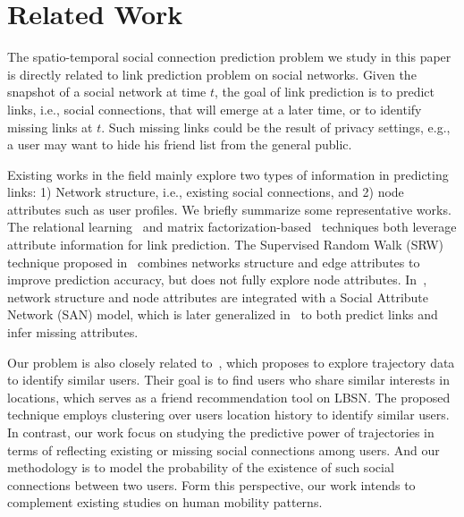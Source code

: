 \section{Related Work} \label{sec:related}

The spatio-temporal social connection prediction problem we study in this paper is directly related to link prediction problem on social networks. Given the snapshot of a social network at time $t$, the goal of link prediction is to predict links, i.e., social connections, that will emerge at a later time, or to identify missing links at $t$. Such missing links could be the result of privacy settings, e.g., a user may want to hide his friend list from the general public. 

Existing works in the field mainly explore two types of information in predicting links: 1) Network structure, i.e., existing social connections, and 2) node attributes such as user profiles. We briefly summarize some representative works. The relational learning~\cite{pieter2003link, yu2006stochastic, miller2009nonparametric} and matrix factorization-based~\cite{menon2011link} techniques both leverage attribute information for link prediction. The Supervised Random Walk (SRW) technique proposed in~\cite{backstrom2011supervised} combines networks structure and edge attributes to improve prediction accuracy, but does not fully explore node attributes. In~\cite{yin2010linkrec}, network structure and node attributes are integrated with a Social Attribute Network (SAN) model, which is later generalized in~\cite{gong2014joint} to both predict links and infer missing attributes.

Our problem is also closely related to~\cite{xiao2010finding}, which proposes to explore trajectory data to identify similar users. Their goal is to find users who share similar interests in locations, which serves as a friend recommendation tool on LBSN. The proposed technique employs clustering over users location history to identify similar users. In contrast, our work focus on studying the predictive power of trajectories in terms of reflecting existing or missing social connections among users. And our methodology is to model the probability of the existence of such social connections between two users. Form this perspective, our work intends to complement existing studies on human mobility patterns.